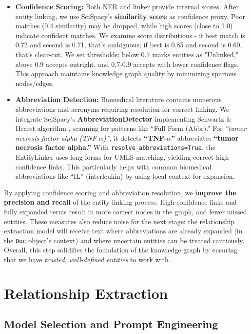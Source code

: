 \begin{itemize}
\item \textbf{Confidence Scoring:} Both NER and linker provide internal scores. After entity linking, we use SciSpacy's \textbf{similarity score} as confidence proxy. Poor matches (0.4 similarity) may be dropped, while high scores (close to 1.0) indicate confident matches. We examine score distributions - if best match is 0.72 and second is 0.71, that's ambiguous; if best is 0.85 and second is 0.60, that's clear-cut. We set thresholds: below 0.7 marks entities as "Unlinked," above 0.9 accepts outright, and 0.7-0.9 accepts with lower confidence flags. This approach maintains knowledge graph quality by minimizing spurious nodes/edges.

\item \textbf{Abbreviation Detection:} Biomedical literature contains numerous abbreviations and acronyms requiring resolution for correct linking. We integrate SciSpacy's \textbf{AbbreviationDetector} implementing Schwartz \& Hearst algorithm \parencite{Schwartz2003}, scanning for patterns like ``Full Form (Abbr).'' For \textit{``tumor necrosis factor alpha (TNF-$\alpha$)''}, it detects \textbf{``TNF-$\alpha$''} abbreviates \textbf{``tumor necrosis factor alpha.''} With \texttt{resolve\_abbreviations=True}, the EntityLinker uses long forms for UMLS matching, yielding correct high-confidence links. This particularly helps with common biomedical abbreviations like ``IL'' (interleukin) by using local context for expansion.
\end{itemize}

By applying confidence scoring and abbreviation resolution, we \textbf{improve the precision and recall} of the entity linking process. High-confidence links and fully expanded terms result in more correct nodes in the graph, and fewer missed entities. These measures also reduce noise for the next stage: the relationship extraction model will receive text where abbreviations are already expanded (in the \texttt{Doc} object's context) and where uncertain entities can be treated cautiously. Overall, this step solidifies the foundation of the knowledge graph by ensuring that we have \textit{trusted, well-defined entities} to work with.

\section{Relationship Extraction}
\label{sec:relationextraction}

\subsection{Model Selection and Prompt Engineering}

